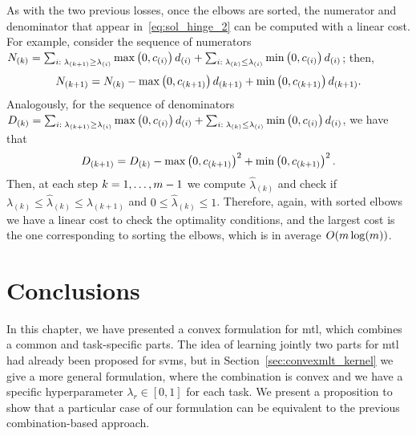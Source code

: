 As with the two previous losses, once the elbows are sorted, the numerator and denominator that appear in~\eqref{eq:sol_hinge_2} can be computed with a linear cost. For example, consider the sequence of numerators $N_{(k)} = \sum_{i:\; \lambda_{(k+1)} \geq \lambda_{(i)}} \max\left(0, c_{(i)}\right) d_{(i)} + \sum_{i:\; \lambda_{(k)} \leq \lambda_{(i)}} \min\left(0, c_{(i)}\right) d_{(i)}$; then, 
$$N_{(k+1)} = N_{(k)} - \max\left(0, c_{(k+1)}\right) d_{(k+1)} + \min\left(0, c_{(k+1)}\right) d_{(k+1)}.$$
Analogously, for the sequence of denominators $D_{(k)} = \sum_{i:\; \lambda_{(k+1)} \geq \lambda_{(i)}} \max\left(0, c_{(i)}\right) d_{(i)} + \sum_{i:\; \lambda_{(k)} \leq \lambda_{(i)}} \min\left(0, c_{(i)}\right) d_{(i)}$, we have that 
$$D_{(k+1)} = D_{(k)} - \max\left(0, c_{(k+1)}\right)^2 + \min\left(0, c_{(k+1)}\right)^2.$$
Then, at each step $k=1, \ldots, m-1$ we compute $\widehat{\lambda}_{(k)}$ and check if $\lambda_{(k)} \leq \widehat{\lambda}_{(k)} \leq \lambda_{(k+1)}$ and $0 \leq \widehat{\lambda}_{(k)} \leq 1$.
Therefore, again, with sorted elbows we have a linear cost to check the optimality conditions, and the largest cost is the one corresponding to sorting the elbows, which is in average $O(m \log(m))$.




\section{Conclusions}\label{sec-conclusions-3}

In this chapter, we have presented a convex formulation for \acrshort{mtl}, which combines a common and task-specific parts. The idea of learning jointly two parts for \acrshort{mtl} had already been proposed for \acrshort{svms}, but in Section~\ref{sec:convexmlt_kernel} we give a more general formulation, where the combination is convex and we have a specific hyperparameter $\lambda_r \in [0, 1]$ for each task.
%
We present a proposition to show that a particular case of our formulation can be equivalent to the previous combination-based approach.

